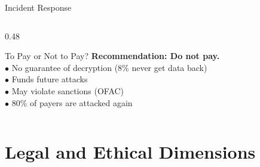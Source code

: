 \documentclass[aspectratio=169]{beamer}
\begin{document}
\begin{frame}{Incident Response}
\begin{columns}[T]
\begin{column}{0.48\textwidth}
      \vspace{0.5em}
      \begin{infobox}{To Pay or Not to Pay?}
        \textbf{Recommendation: Do not pay.}\\
        $\bullet$ No guarantee of decryption (8\% never get data back)\\
        $\bullet$ Funds future attacks\\
        $\bullet$ May violate sanctions (OFAC)\\
        $\bullet$ 80\% of payers are attacked again
      \end{infobox}
    \end{column}
  \end{columns}
\end{frame}

\section{Legal and Ethical Dimensions}
\end{document}
